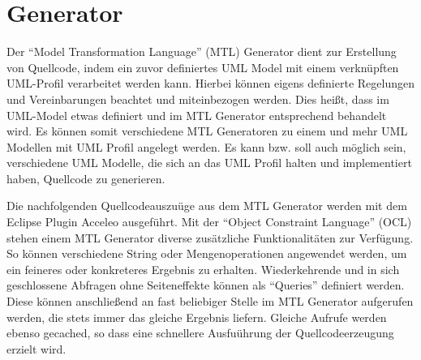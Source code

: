 \chapter{Generator}
\label{Generator}
Der “Model Transformation Language” (MTL) Generator dient zur Erstellung von
Quellcode, indem ein zuvor definiertes UML Model mit einem verknüpften
UML-Profil verarbeitet werden kann. Hierbei können eigens definierte Regelungen
und Vereinbarungen beachtet und miteinbezogen werden. Dies heißt, dass im
UML-Model etwas definiert und im MTL Generator entsprechend behandelt wird. Es
können somit verschiedene MTL Generatoren zu einem und mehr UML Modellen mit UML
Profil angelegt werden. Es kann bzw. soll auch möglich sein, verschiedene UML
Modelle, die sich an das UML Profil halten und implementiert haben, Quellcode zu
generieren.

Die nachfolgenden Quellcodeauszuüge aus dem MTL Generator werden mit dem Eclipse
Plugin Acceleo ausgeführt. Mit der “Object Constraint Language” (OCL) stehen
einem MTL Generator diverse zusätzliche Funktionalitäten zur Verfügung. So
können verschiedene String oder Mengenoperationen angewendet werden, um ein
feineres oder konkreteres Ergebnis zu erhalten. Wiederkehrende und in sich
geschlossene Abfragen ohne Seiteneffekte können als “Queries” definiert werden.
Diese können anschließend an fast beliebiger Stelle im MTL Generator aufgerufen
werden, die stets immer das gleiche Ergebnis liefern. Gleiche Aufrufe werden
ebenso gecached, so dass eine schnellere Ausfuührung der Quellcodeerzeugung erzielt wird.
